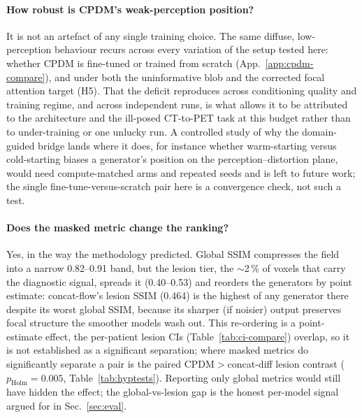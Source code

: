 \documentclass[11pt,a4paper]{article}
\newcommand{\num}[1]{#1}
\begin{document}
\paragraph{How robust is CPDM's weak-perception position?} It is not an artefact of any single
training choice. The same diffuse, low-perception behaviour recurs across every variation of
the setup tested here: whether CPDM is fine-tuned or trained from scratch
(App.~\ref{app:cpdm-compare}), and under both the uninformative blob and the corrected focal
attention target (H5). That the deficit reproduces across conditioning quality and training
regime, and across independent runs, is what allows it to be attributed to the architecture and
the ill-posed CT-to-PET task at this budget rather than to under-training or one unlucky run. A controlled
study of why the domain-guided bridge lands where it does, for instance whether
warm-starting versus cold-starting biases a generator's position on the perception--distortion
plane, would need compute-matched arms and repeated seeds and is left to future work; the
single fine-tune-versus-scratch pair here is a convergence check, not such a test.

\paragraph{Does the masked metric change the ranking?} Yes, in the way the methodology
predicted. Global SSIM compresses the field into a narrow \num{0.82}--\num{0.91} band, but the
lesion tier, the $\sim$\num{2}\,\% of voxels that carry the diagnostic signal, spreads it
(\num{0.40}--\num{0.53}) and reorders the generators by point estimate: concat-flow's lesion
SSIM (\num{0.464}) is the highest of any generator there despite its worst global SSIM,
because its sharper (if noisier) output preserves focal structure the smoother models wash
out. This re-ordering is a point-estimate effect, the per-patient lesion CIs
(Table~\ref{tab:ci-compare}) overlap, so it is not established as a significant separation;
where masked metrics do significantly separate a pair is the paired CPDM$>$concat-diff
lesion contrast ($p_{\text{Holm}}\!=\!0.005$, Table~\ref{tab:hyptests}). Reporting only global
metrics would still have hidden the effect; the global-vs-lesion gap is the honest per-model
signal argued for in Sec.~\ref{sec:eval}.
\end{document}
